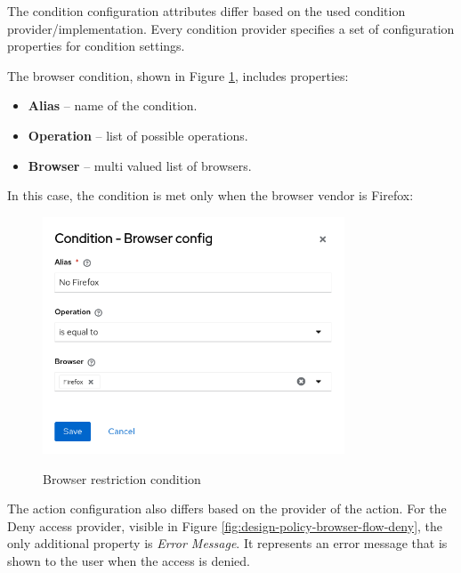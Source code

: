 The condition configuration attributes differ based on the used condition provider/implementation.
Every condition provider specifies a set of configuration properties for condition settings.

The browser condition, shown in Figure \ref{fig:design-policy-browser-flow-condition}, includes properties:

\begin{itemize}
    \item \textbf{Alias} -- name of the condition.
    \item \textbf{Operation} -- list of possible operations.
    \item \textbf{Browser} -- multi valued list of browsers. 
\end{itemize}

In this case, the condition is met only when the browser vendor is Firefox:

\begin{figure}[htbp]
  \centering
  \includegraphics[width=0.8\textwidth]{img/sections/5-design/policy-browser-condition.png}
  \label{fig:design-policy-browser-flow-condition}
  \caption{Browser restriction condition}
\end{figure}

The action configuration also differs based on the provider of the action.
For the Deny access provider, visible in Figure \ref{fig:design-policy-browser-flow-deny}, the only additional property is \textit{Error Message}.
It represents an error message that is shown to the user when the access is denied.


